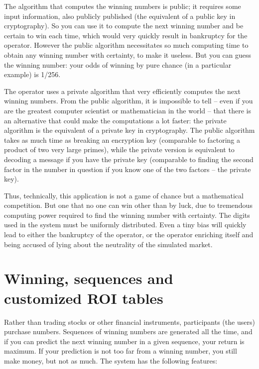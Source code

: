 \documentclass[oneside,10pt]{book}
\begin{document}
The algorithm that computes the winning numbers is public; it requires some input information, also publicly published (the equivalent of a public key in cryptography). So you can use it to compute the next winning number and be certain to win each time, which would very quickly result in bankruptcy for the operator. However the public algorithm necessitates so much computing time to obtain any winning number with certainty, to make it useless. But you can guess the winning number: your odds of winning by pure chance (in a particular example) is 1/256. 

The operator uses a private algorithm 
that very efficiently computes the next winning numbers. From the public algorithm, it is impossible to tell -- even if you are the greatest computer scientist or mathematician in the world -- that there is an alternative that could make the computations a lot faster: the private algorithm is the equivalent of a private key in cryptography. The public algorithm takes as much time as breaking an encryption key (comparable to factoring a product of two very large primes), while the private version is equivalent to decoding a message if you have the private key (comparable to finding the second factor in  the number in question if you know one of the two factors -- the private key).

Thus, technically, this application is not a game of chance but a mathematical competition. But one that no one can win 
other than by luck, due to tremendous computing power required to find the winning number with certainty. The 
digits used in the system must be uniformly distributed. Even a tiny bias will quickly lead to either the bankruptcy of the operator, or the operator enriching itself and being accused of lying about the neutrality of the simulated market.
  


\section{Winning, sequences and customized ROI tables}

Rather than trading stocks or other financial instruments, participants (the users) purchase numbers. Sequences of winning numbers are generated all the time, and if you can predict the next winning number in a given sequence, your return is maximum. If your prediction is not too far from a winning number, you still make money, but not as much. The system has the following features:
\vspace{1ex}
\end{document}
